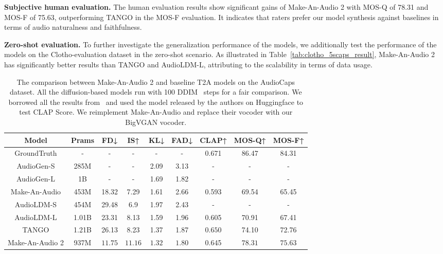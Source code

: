 \documentclass{article}
\begin{document}
\textbf{Subjective human evaluation.}
The human evaluation results show significant gains of Make-An-Audio 2 with MOS-Q of 78.31 and MOS-F of 75.63, outperforming TANGO in the MOS-F evaluation. It indicates that raters prefer our model synthesis against baselines in terms of audio naturalness and faithfulness. 



\textbf{Zero-shot evaluation.} 
To further investigate the generalization performance of the models, we additionally test the performance of the models on the Clotho-evaluation dataset in the zero-shot scenario. As illustrated in Table~\ref{tab:clotho_5scaps_result}, Make-An-Audio 2 has significantly better results than TANGO and AudioLDM-L, attributing to the scalability in terms of data usage. 


\begin{table*}[]
\centering
\caption{The comparison between Make-An-Audio 2 and baseline T2A models on the AudioCaps dataset. All the diffusion-based models run with 100 DDIM~\cite{ddim} steps for a fair comparison. We borrowed all the results from~\cite{liuAudioLDMTexttoAudioGeneration2023,ghosal2023texttoaudio} and used the model released by the authors on Huggingface to test CLAP Score. We reimplement Make-An-Audio and replace their vocoder with our BigVGAN vocoder. }
\vspace{2mm}
\small
\begin{tabular}{ccccccccc}
\toprule
Model  & Prams  & FD↓    & IS↑    & KL↓    & FAD↓   & CLAP↑  & MOS-Q↑ & MOS-F↑ \\
\midrule
GroundTruth & -   & -      & -      & -   & -   & 0.671   &  86.47     & 84.31  \\
AudioGen-S & 285M   & -      & -      & 2.09   & 3.13   & -      & -      & -  \\
AudioGen-L & 1B     & -      & -      & 1.69   & 1.82   & -      & -      & -  \\
Make-An-Audio & 453M   & 18.32  & 7.29   & 1.61   & 2.66   & 0.593  &  69.54    & 65.45  \\
AudioLDM-S & 454M   & 29.48  & 6.9    & 1.97   & 2.43   &  -     & -      & - \\
AudioLDM-L & 1.01B   & 23.31  & 8.13   & 1.59   & 1.96   & 0.605   &  70.91      & 67.41 \\
TANGO  & 1.21B   & 26.13  & 8.23   & 1.37   & 1.87   & $\mathbf{0.650}$  &  74.10   & 72.76 \\
\midrule
Make-An-Audio 2 & 937M   & $\mathbf{11.75}$  & $\mathbf{11.16}$  & $\mathbf{1.32}$    & $\mathbf{1.80}$   &  0.645      &   $\mathbf{78.31}$     & $\mathbf{75.63}$ \\
\bottomrule
\end{tabular}\label{tab:comp}\end{table*}
\end{document}
